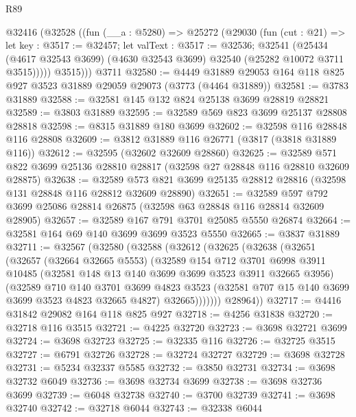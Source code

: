 \begin{lexlean}{R89}
\begin{coremodule}
    @32416
      (@32528
        ((fun (__a : @5280) =>
        @25272
          (@29030
            (fun (cut : @21) =>
            let key : @3517 := @32457;
            let valText : @3517 := @32536;
            @32541
              (@25434
                (@4617 @32543 @3699)
                (@4630 @32543 @3699)
                @32540
                (@25282 @10072 @3711 @3515)))))
          @3515)))
    @3711
@32580 := @4449 @31889 @29053 @164 @118 @825 @927 @3523 @31889 @29059 @29073 (@3773 (@4464 @31889))
@32581 := @3783 @31889
@32588 := @32581 @145 @132 @824 @25138 @3699 @28819 @28821
@32589 := @3803 @31889
@32595 := @32589 @569 @823 @3699 @25137 @28808 @28818
@32598 := @8315 @31889 @180 @3699
@32602 := @32598 @116 @28848 @116 @28808
@32609 := @3812 @31889 @116 @26771 (@3817 (@3818 @31889 @116))
@32612 := @32595 (@32602 @32609 @28860)
@32625 := @32589 @571 @822 @3699 @25136 @28810 @28817 (@32598 @27 @28848 @116 @28810 @32609 @28875)
@32638 := @32589 @573 @821 @3699 @25135 @28812 @28816 (@32598 @131 @28848 @116 @28812 @32609 @28890)
@32651 := @32589 @597 @792 @3699 @25086 @28814 @26875 (@32598 @63 @28848 @116 @28814 @32609 @28905)
@32657 := @32589 @167 @791 @3701 @25085 @5550 @26874
@32664 := @32581 @164 @69 @140 @3699 @3699 @3523 @5550
@32665 := @3837 @31889
@32711 := @32567
    (@32580
      (@32588
        (@32612
          (@32625
            (@32638
              (@32651
                (@32657
                  (@32664 @32665 @5553)
                  (@32589
                    @154
                    @712
                    @3701
                    @6998
                    @3911
                    @10485
                    (@32581 @148 @13 @140 @3699 @3699 @3523 @3911 @32665 @3956)
                    (@32589
                      @710
                      @140
                      @3701
                      @3699
                      @4823
                      @3523
                      (@32581 @707 @15 @140 @3699 @3699 @3523 @4823 @32665 @4827)
                      @32665)))))))
        @28964))
@32717 := @4416 @31842 @29082 @164 @118 @825 @927
@32718 := @4256 @31838
@32720 := @32718 @116 @3515
@32721 := @4225 @32720
@32723 := @3698 @32721 @3699
@32724 := @3698 @32723
@32725 := @32335 @116
@32726 := @32725 @3515
@32727 := @6791 @32726
@32728 := @32724 @32727
@32729 := @3698 @32728
@32731 := @5234 @32337 @5585
@32732 := @3850 @32731
@32734 := @3698 @32732 @6049
@32736 := @3698 @32734 @3699
@32738 := @3698 @32736 @3699
@32739 := @6048 @32738
@32740 := @3700 @32739
@32741 := @3698 @32740
@32742 := @32718 @6044
@32743 := @32338 @6044

\end{coremodule}
\end{lexlean}
